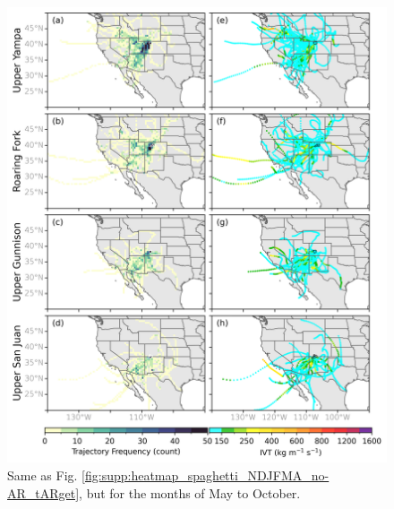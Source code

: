 \documentclass[draft,jgrga]{agutexSI2019}
\begin{document}
\begin{article}
\begin{figure}
\noindent\includegraphics[scale=0.8]{figS4.png}
\caption{Same as Fig. \ref{fig:supp:heatmap_spaghetti_NDJFMA_no-AR_tARget}, but for the months of May to October.}
\label{fig:supp:heatmap_spaghetti_MJJASO_no-AR_tARget}
\end{figure}


\end{article}
\end{document}

